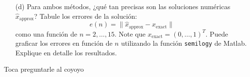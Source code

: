 \begin{enumerate}
    \item[(d)] Para ambos métodos, ¿qué tan precisas son las soluciones numéricas $\hat{x}_{\text{approx}}$? Tabule los errores de la solución:
    \[
    e(n) = \|\hat{x}_{\text{approx}} - x_{\text{exact}}\|
    \]
    como una función de $n = 2, \ldots, 15$. Note que $x_{\text{exact}} = (0, \ldots, 1)^T$. Puede graficar los errores en función de $n$ utilizando la función \texttt{semilogy} de Matlab. Explique en detalle los resultados.
\end{enumerate}

\begin{solution}
Toca preguntarle al coyoyo
\end{solution}